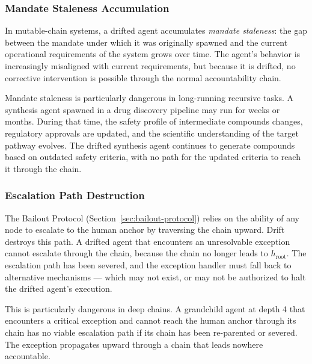\subsubsection{Mandate Staleness Accumulation}
\label{sec:mandate-staleness}

In mutable-chain systems, a drifted agent accumulates \emph{mandate staleness}: the gap between the mandate under which it was originally spawned and the current operational requirements of the system grows over time. The agent's behavior is increasingly misaligned with current requirements, but because it is drifted, no corrective intervention is possible through the normal accountability chain.

Mandate staleness is particularly dangerous in long-running recursive tasks. A synthesis agent spawned in a drug discovery pipeline may run for weeks or months. During that time, the safety profile of intermediate compounds changes, regulatory approvals are updated, and the scientific understanding of the target pathway evolves. The drifted synthesis agent continues to generate compounds based on outdated safety criteria, with no path for the updated criteria to reach it through the chain.

\subsubsection{Escalation Path Destruction}
\label{sec:escalation-path-destruction}

The Bailout Protocol (Section~\ref{sec:bailout-protocol}) relies on the ability of any node to escalate to the human anchor by traversing the chain upward. Drift destroys this path. A drifted agent that encounters an unresolvable exception cannot escalate through the chain, because the chain no longer leads to $h_{\text{root}}$. The escalation path has been severed, and the exception handler must fall back to alternative mechanisms — which may not exist, or may not be authorized to halt the drifted agent's execution.

This is particularly dangerous in deep chains. A grandchild agent at depth 4 that encounters a critical exception and cannot reach the human anchor through its chain has no viable escalation path if its chain has been re-parented or severed. The exception propagates upward through a chain that leads nowhere accountable.


